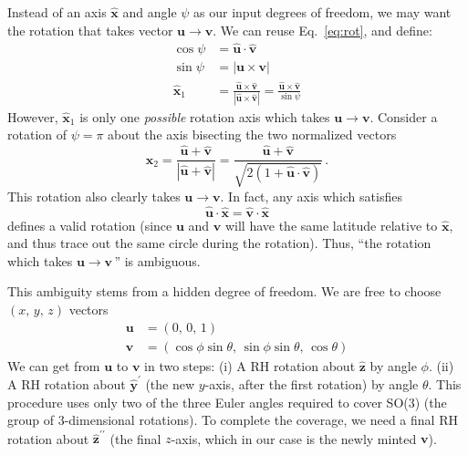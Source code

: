 \documentclass[12pt, nofootinbib, notitlepage]{revtex4-1}
\renewcommand{\vec}[1]{\boldsymbol{#1}}
\newcommand{\vecN}[1]{\vec{\hat{#1}}}
\newcommand{\ds}{^{}}
\newcommand{\abs}[1]{|#1|}
\newcommand{\vvv}[3]{(#1,\,#2,\,#3)}
\newcommand{\ang}{\psi}
\newcommand{\ax}{\vecN{x}}
\begin{document}
Instead of an axis $\ax$ and angle $\ang$ as our input degrees of freedom,
we may want the rotation that takes vector $\vec{u}\to\vec{v}$.
We can reuse Eq.~\ref{eq:rot}, and define:
\begin{align}
	\cos\ang & = \vecN{u}\cdot\vecN{v}\\
	\sin\ang & = \abs{\vec{u}\times\vec{v}}\\
	\ax_1\ds & = \frac{\vecN{u}\times\vecN{v}}{\abs{\vecN{u}\times\vecN{v}}}
		= \frac{\vecN{u}\times\vecN{v}}{\sin\ang}\label{eq:x1}
\end{align}
However, $\ax_1\ds$ is only one \emph{possible} rotation axis which takes 
$\vec{u}\to \vec{v}$. Consider a rotation of $\ang = \pi$ 
about the axis bisecting the two normalized vectors
\begin{equation}\label{eq:x2}
	\ax_2\ds = \frac{\vecN{u} + \vecN{v}}{\abs{\vecN{u} + \vecN{v}}} 
		= \frac{\vecN{u} + \vecN{v}}{\sqrt{2(1+\vecN{u}\cdot\vecN{v})}}
	\,.
\end{equation}
This rotation also clearly takes $\vec{u}\to\vec{v}$.
In fact, any axis which satisfies 
\begin{equation}
	\vecN{u}\cdot\ax = \vecN{v}\cdot\ax
\end{equation}
defines a valid rotation (since $\vec{u}$ and $\vec{v}$ will have 
the same latitude relative to $\ax$, 
and thus trace out the same circle during the rotation).
Thus, ``the rotation which takes $\vec{u}\to\vec{v}\,$'' is ambiguous.

This ambiguity stems from a hidden degree of freedom.
We are free to choose $\vvv{x}{y}{z}$ vectors 
\begin{align}
	\vec{u} & = \vvv{0}{0}{1}\\
	\vec{v} & = \vvv{\cos \phi \sin \theta}{\sin \phi \sin \theta}{\cos\theta}
\end{align}
We can get from $\vec{u}$ to $\vec{v}$ in two steps:
(i) A RH rotation about $\vecN{z}$ by angle $\phi$.
(ii) A RH rotation about $\vecN{y}^\prime$ (the new $y$-axis, after the first rotation) by angle $\theta$.
This procedure uses only two of the three Euler angles required to 
cover SO(3) (the group of 3-dimensional rotations).
To complete the coverage, we need a final RH rotation about $\vecN{z}^{\prime\prime}$ 
(the final $z$-axis, which in our case is the newly minted $\vec{v}$).
\end{document}
